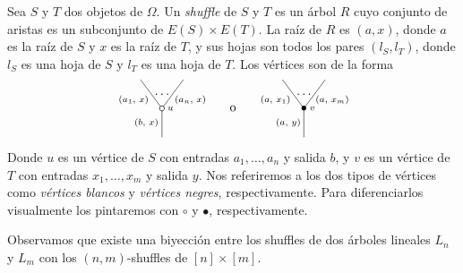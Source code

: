 \documentclass[../main.tex]{subfiles}
\begin{document}
\begin{defi}
    Sea $S$ y $T$ dos objetos de $\Omega$. Un \emph{shuffle} de $S$ y $T$ es un \'arbol $R$ cuyo conjunto de aristas es un subconjunto de $E(S)\times E(T)$. La ra\'iz de $R$ es $(a,x)$, donde $a$ es la ra\'iz de $S$ y $x$ es la ra\'iz de $T$,
    y sus hojas son todos los pares $(l_S,l_T)$, donde $l_S$ es una hoja de $S$ y $l_T$ es una hoja de $T$. Los v\'ertices son de la forma
    $$
        \xy
        <0.08cm, 0cm>:
        (0.0, 0.0)*{}="1"; %
        (0.0, 10.0)*\cir<2pt>{}="2"; %
        (-7.5, 20.0)*{}="3"; %
        (7.5, 20.0)*{}="4"; %
        "1";"2" **\dir{-};
        "2";"3" **\dir{-};
        "2";"4" **\dir{-};
        (3.0, 10.0)*=0{\scriptstyle u};
        (-5.5, 5)*=0{\scriptstyle (b,\text{ }x)};
        (-10, 13.0)*=0{\scriptstyle (a_1,\text{ }x)};
        (10, 13.0)*=0{\scriptstyle (a_n,\text{ }x)};
        (0,15)*{\dots};
        \endxy
        \xy
        <0.08cm, 0cm>:
        (-15, 0.0)*{}="1";
        (15, 10.0)*{}="2";
        (0,10)*{\rm o};
        \endxy
        \xy
        <0.08cm, 0cm>:
        (0.0, 0.0)*{}="1"; %
        (0.0, 10.0)*=0{\bullet}="2"; %
        (-7.5, 20.0)*{}="3"; %
        (7.5, 20.0)*{}="4"; %
        "1";"2" **\dir{-};
        "2";"3" **\dir{-};
        "2";"4" **\dir{-};
        (3.0, 10.0)*=0{\scriptstyle v};
        (-5.5, 5)*=0{\scriptstyle (a,\text{ }y)};
        (-10, 13.0)*=0{\scriptstyle (a,\text{ }x_1)};
        (10, 13.0)*=0{\scriptstyle (a,\text{ }x_m)};
        (0,15)*{\dots};
        \endxy
    $$
    Donde $u$ es un v\'ertice de $S$ con entradas $a_1,\dots,a_n$ y salida $b$, y $v$ es un v\'ertice de $T$ con entradas $x_1,\dots,x_m$ y salida $y$. Nos referiremos a los dos tipos de v\'ertices como \emph{v\'ertices blancos} y \emph{v\'ertices negres}, respectivamente. Para diferenciarlos visualmente los pintaremos con $\circ$ y $\bullet$, respectivamente.

    Observamos que existe una biyecci\'on entre los shuffles de dos \'arboles lineales $L_n$ y $L_m$ con los $(n,m)$-shuffles de $[n]\times[m]$.
\end{defi}
\end{document}
